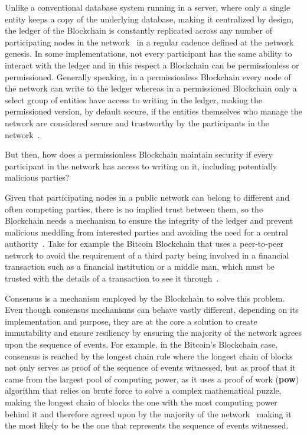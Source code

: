 Unlike a conventional database system running in a server, where only a single
entity keeps a copy of the underlying database, making it centralized by
design, the ledger of the Blockchain is constantly replicated across any number
of participating nodes in the network~\cite{Lewis2015} in a regular cadence
defined at the network genesis. In some implementations, not every participant
has the same ability to interact with the ledger and in this respect a
Blockchain can be permissionless or permissioned. Generally speaking, in a
permissionless Blockchain every node of the network can write to the ledger
whereas in a permissioned Blockchain only a select group of entities have
access to writing in the ledger, making the permissioned version, by default
secure, if the entities themselves who manage the network are considered secure
and trustworthy by the participants in the
network~\cite{Lewis2015,Valenta2017}.

But then, how does a permissionless Blockchain maintain security if every
participant in the network has access to writing on it, including potentially
malicious parties?

Given that participating nodes in a public network can belong to different and
often competing parties, there is no implied trust between them, so the
Blockchain needs a mechanism to ensure the integrity of the ledger and prevent
malicious meddling from interested parties and avoiding the need for a central
authority~\cite{Barclay2017}.  Take for example the Bitcoin Blockchain that
uses a peer-to-peer network to avoid the requirement of a third party being
involved in a financial transaction such as a financial institution or a middle
man, which must be trusted with the details of a transaction to see it
through~\cite{Nakamoto2008}.

Consensus is a mechanism employed by the Blockchain to solve this problem.
Even though consensus mechanisms can behave vastly different, depending on its
implementation and purpose, they are at the core a solution to create
immutability and ensure resiliency by ensuring the majority of the network
agrees upon the sequence of events.  For example, in the Bitcoin's Blockchain
case, consensus is reached by the longest chain rule where the longest chain of
blocks not only serves as proof of the sequence of events witnessed, but as
proof that it came from the largest pool of computing power, as it uses a proof
of work (\textbf{pow}) algorithm that relies on brute force to solve a complex
mathematical puzzle, making the longest chain of blocks the one with the most
computing power behind it and therefore agreed upon by the majority of the
network~\cite{Baars2016,Wood2017} making it the most likely to be the one that
represents the sequence of events witnessed.


